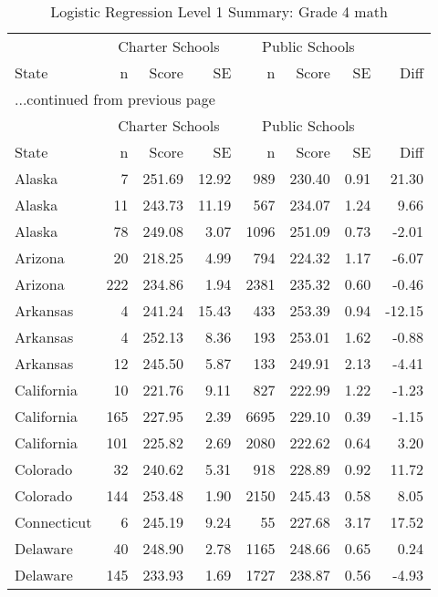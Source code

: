 \begin{longtable}{lrrr@{\extracolsep{10pt}}rrrr}
\caption{Logistic Regression Level 1 Summary: Grade 4 math} \\ 
  \hline
  & \multicolumn{3}{c}{Charter Schools} & \multicolumn{3}{c}{Public Schools} & \\ \cline{2-4} \cline{5-7} State & n & Score & SE & n & Score & SE & Diff \\ \endfirsthead \multicolumn{8}{l}{{...continued from previous page}}\\ \hline & \multicolumn{3}{c}{Charter Schools} & \multicolumn{3}{c}{Public Schools} & \\ \cline{2-4} \cline{5-7} State & n & Score & SE & n & Score & SE & Diff \\ \hline \endhead \hline \endfoot \endlastfoot \hline
Alaska &   7 & 251.69 & 12.92 & 989 & 230.40 & 0.91 & 21.30 \\ 
  Alaska &  11 & 243.73 & 11.19 & 567 & 234.07 & 1.24 & 9.66 \\ 
  Alaska &  78 & 249.08 & 3.07 & 1096 & 251.09 & 0.73 & -2.01 \\ 
  Arizona &  20 & 218.25 & 4.99 & 794 & 224.32 & 1.17 & -6.07 \\ 
  Arizona & 222 & 234.86 & 1.94 & 2381 & 235.32 & 0.60 & -0.46 \\ 
  Arkansas &   4 & 241.24 & 15.43 & 433 & 253.39 & 0.94 & -12.15 \\ 
  Arkansas &   4 & 252.13 & 8.36 & 193 & 253.01 & 1.62 & -0.88 \\ 
  Arkansas &  12 & 245.50 & 5.87 & 133 & 249.91 & 2.13 & -4.41 \\ 
  California &  10 & 221.76 & 9.11 & 827 & 222.99 & 1.22 & -1.23 \\ 
  California & 165 & 227.95 & 2.39 & 6695 & 229.10 & 0.39 & -1.15 \\ 
  California & 101 & 225.82 & 2.69 & 2080 & 222.62 & 0.64 & 3.20 \\ 
  Colorado &  32 & 240.62 & 5.31 & 918 & 228.89 & 0.92 & 11.72 \\ 
  Colorado & 144 & 253.48 & 1.90 & 2150 & 245.43 & 0.58 & 8.05 \\ 
  Connecticut &   6 & 245.19 & 9.24 &  55 & 227.68 & 3.17 & 17.52 \\ 
  Delaware &  40 & 248.90 & 2.78 & 1165 & 248.66 & 0.65 & 0.24 \\ 
  Delaware & 145 & 233.93 & 1.69 & 1727 & 238.87 & 0.56 & -4.93 \\ 

\end{longtable}
